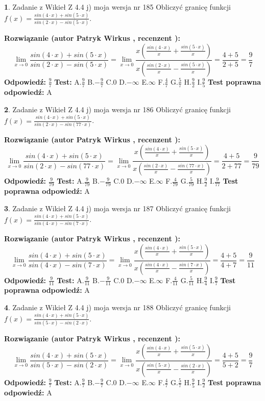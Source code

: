 \documentclass[12pt, a4paper]{article}
\theoremstyle{definition} %
\newtheorem{zad}{}
\newcommand{\zadStart}[1]{\begin{zad}#1\newline}
\newcommand{\zadStop}{\end{zad}}
\newcommand{\rozwStart}[2]{\noindent \textbf{Rozwiązanie (autor #1 , recenzent #2): }\newline}
\newcommand{\rozwStop}{\newline}
\newcommand{\odpStart}{\noindent \textbf{Odpowiedź:}\newline}
\newcommand{\odpStop}{\newline}
\newcommand{\testStart}{\noindent \textbf{Test:}\newline}
\newcommand{\testStop}{\newline}
\newcommand{\kluczStart}{\noindent \textbf{Test poprawna odpowiedź:}\newline}
\newcommand{\kluczStop}{\newline}
\begin{document}
\zadStart{Zadanie z Wikieł Z 4.4 j) moja wersja nr 185}
Obliczyć granicę funkcji $f(x)=\frac{sin(4\cdot x) +sin(5\cdot x)}{sin(2\cdot x) -sin(5\cdot x)}$.
\zadStop
\rozwStart{Patryk Wirkus}{}
$$\lim\limits_{x\to 0}\frac{sin(4\cdot x) +sin(5\cdot x)}{sin(2\cdot x) -sin(5\cdot x)}=\lim\limits_{x\to 0}\frac{x(\frac{sin(4\cdot x)}{x}+\frac{sin(5\cdot x)}{x})}{x(\frac{sin(2\cdot x)}{x}-\frac{sin(5\cdot x)}{x})}=\frac{4+5}{2+5} = \frac{9}{7}$$
\rozwStop
\odpStart
$\frac{9}{7}$
\odpStop
\testStart
A.$\frac{9}{7}$
B.$-\frac{9}{7}$
C.$0$
D.$-\infty$
E.$\infty$
F.$\frac{4}{7}$
G.$\frac{5}{7}$
H.$\frac{9}{2}$
I.$\frac{9}{5}$
\testStop
\kluczStart
A
\kluczStop



\zadStart{Zadanie z Wikieł Z 4.4 j) moja wersja nr 186}
Obliczyć granicę funkcji $f(x)=\frac{sin(4\cdot x) +sin(5\cdot x)}{sin(2\cdot x) -sin(77\cdot x)}$.
\zadStop
\rozwStart{Patryk Wirkus}{}
$$\lim\limits_{x\to 0}\frac{sin(4\cdot x) +sin(5\cdot x)}{sin(2\cdot x) -sin(77\cdot x)}=\lim\limits_{x\to 0}\frac{x(\frac{sin(4\cdot x)}{x}+\frac{sin(5\cdot x)}{x})}{x(\frac{sin(2\cdot x)}{x}-\frac{sin(77\cdot x)}{x})}=\frac{4+5}{2+77} = \frac{9}{79}$$
\rozwStop
\odpStart
$\frac{9}{79}$
\odpStop
\testStart
A.$\frac{9}{79}$
B.$-\frac{9}{79}$
C.$0$
D.$-\infty$
E.$\infty$
F.$\frac{4}{79}$
G.$\frac{5}{79}$
H.$\frac{9}{2}$
I.$\frac{9}{77}$
\testStop
\kluczStart
A
\kluczStop



\zadStart{Zadanie z Wikieł Z 4.4 j) moja wersja nr 187}
Obliczyć granicę funkcji $f(x)=\frac{sin(4\cdot x) +sin(5\cdot x)}{sin(4\cdot x) -sin(7\cdot x)}$.
\zadStop
\rozwStart{Patryk Wirkus}{}
$$\lim\limits_{x\to 0}\frac{sin(4\cdot x) +sin(5\cdot x)}{sin(4\cdot x) -sin(7\cdot x)}=\lim\limits_{x\to 0}\frac{x(\frac{sin(4\cdot x)}{x}+\frac{sin(5\cdot x)}{x})}{x(\frac{sin(4\cdot x)}{x}-\frac{sin(7\cdot x)}{x})}=\frac{4+5}{4+7} = \frac{9}{11}$$
\rozwStop
\odpStart
$\frac{9}{11}$
\odpStop
\testStart
A.$\frac{9}{11}$
B.$-\frac{9}{11}$
C.$0$
D.$-\infty$
E.$\infty$
F.$\frac{4}{11}$
G.$\frac{5}{11}$
H.$\frac{9}{4}$
I.$\frac{9}{7}$
\testStop
\kluczStart
A
\kluczStop



\zadStart{Zadanie z Wikieł Z 4.4 j) moja wersja nr 188}
Obliczyć granicę funkcji $f(x)=\frac{sin(4\cdot x) +sin(5\cdot x)}{sin(5\cdot x) -sin(2\cdot x)}$.
\zadStop
\rozwStart{Patryk Wirkus}{}
$$\lim\limits_{x\to 0}\frac{sin(4\cdot x) +sin(5\cdot x)}{sin(5\cdot x) -sin(2\cdot x)}=\lim\limits_{x\to 0}\frac{x(\frac{sin(4\cdot x)}{x}+\frac{sin(5\cdot x)}{x})}{x(\frac{sin(5\cdot x)}{x}-\frac{sin(2\cdot x)}{x})}=\frac{4+5}{5+2} = \frac{9}{7}$$
\rozwStop
\odpStart
$\frac{9}{7}$
\odpStop
\testStart
A.$\frac{9}{7}$
B.$-\frac{9}{7}$
C.$0$
D.$-\infty$
E.$\infty$
F.$\frac{4}{7}$
G.$\frac{5}{7}$
H.$\frac{9}{5}$
I.$\frac{9}{2}$
\testStop
\kluczStart
A
\kluczStop
\end{document}
